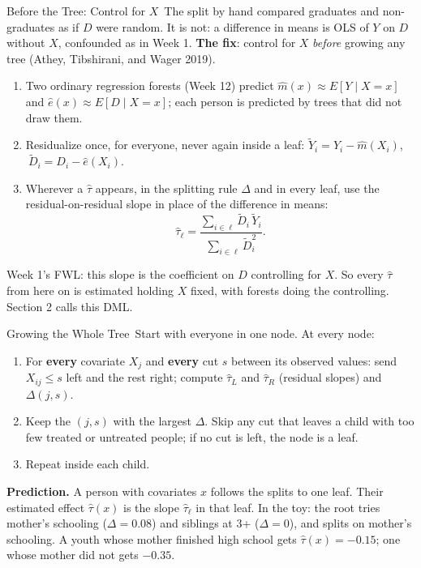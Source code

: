 \documentclass[aspectratio=169,11pt,xcolor=dvipsnames]{beamer}
\newcommand{\srcp}[1]{{\scriptsize\color{gray}(#1)}}
\newcommand{\E}{E}
\newcommand{\core}{\,\raisebox{0.6pt}{\textcolor{corestar}{$\bigstar$}}}
\begin{document}
\begin{frame}{Before the Tree: Control for $X$\core}
The split by hand compared graduates and non-graduates as if $D$ were random. It is not: a difference
in means is OLS of $Y$ on $D$ without $X$, confounded as in Week 1.
\vskip3pt
\textbf{The fix}: control for $X$ \emph{before} growing any tree \srcp{Athey, Tibshirani, and Wager 2019}.
\begin{enumerate}\itemsep3pt
  \item Two ordinary regression forests (Week 12) predict $\hat m(x) \approx \E[Y\mid X = x]$ and
        $\hat e(x) \approx \E[D\mid X = x]$; each person is predicted by trees that did not draw them.
  \item Residualize once, for everyone, never again inside a leaf:
        $\tilde Y_i = Y_i - \hat m(X_i)$, $\ \tilde D_i = D_i - \hat e(X_i)$.
  \item Wherever a $\hat\tau$ appears, in the splitting rule $\Delta$ and in every leaf, use the residual-on-residual
        slope in place of the difference in means:
        \[ \hat\tau_\ell = \frac{\sum_{i\in\ell}\tilde D_i\,\tilde Y_i}{\sum_{i\in\ell}\tilde D_i^2} . \]
\end{enumerate}
\vskip-2pt
{\small Week 1's FWL: this slope is the coefficient on $D$ controlling for $X$. So every $\hat\tau$ from here on is
estimated holding $X$ fixed, with forests doing the controlling. Section 2 calls this DML.}
\end{frame}

\begin{frame}{Growing the Whole Tree\core}
Start with everyone in one node. At every node:
\vskip2pt
\begin{enumerate}\itemsep4pt
  \item For \textbf{every} covariate $X_j$ and \textbf{every} cut $s$ between its observed values: send
        $X_{ij} \leq s$ left and the rest right; compute $\hat\tau_L$ and $\hat\tau_R$ (residual slopes)
        and $\Delta(j, s)$.
  \item Keep the $(j, s)$ with the largest $\Delta$. Skip any cut that leaves a child with too few
        treated or untreated people; if no cut is left, the node is a leaf.
  \item Repeat inside each child.
\end{enumerate}
\vskip4pt
\textbf{Prediction.} A person with covariates $x$ follows the splits to one leaf. Their estimated effect
$\hat\tau(x)$ is the slope $\hat\tau_\ell$ in that leaf.
\vskip4pt
{\small In the toy: the root tries mother's schooling ($\Delta = 0.08$) and siblings at 3+ ($\Delta = 0$), and splits on
mother's schooling. A youth whose mother finished high school gets $\hat\tau(x) = -0.15$; one whose
mother did not gets $-0.35$.}
\end{frame}
\end{document}
